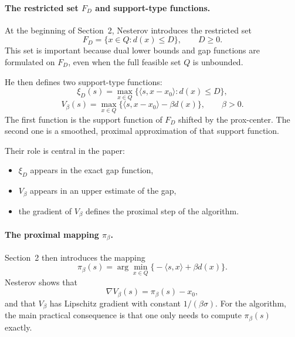 \documentclass[12pt,a4paper]{article}
\begin{document}
\paragraph{The restricted set $F_D$ and support-type functions.}
At the beginning of Section~2, Nesterov introduces the restricted set
\begin{equation}
    F_D = \{x \in Q : d(x) \le D\}, \qquad D \ge 0.
\end{equation}
This set is important because dual lower bounds and gap functions are formulated on $F_D$, even when the full feasible set $Q$ is unbounded.

He then defines two support-type functions:
\begin{equation}
    \xi_D(s) = \max_{x \in Q} \{ \langle s, x-x_0 \rangle : d(x) \le D \},
\end{equation}
\begin{equation}
    V_\beta(s) = \max_{x \in Q} \{ \langle s, x-x_0 \rangle - \beta d(x) \}, \qquad \beta > 0.
\end{equation}
The first function is the support function of $F_D$ shifted by the prox-center. The second one is a smoothed, proximal approximation of that support function.

Their role is central in the paper:
\begin{itemize}[leftmargin=1.2cm]
    \item $\xi_D$ appears in the exact gap function,
    \item $V_\beta$ appears in an upper estimate of the gap,
    \item the gradient of $V_\beta$ defines the proximal step of the algorithm.
\end{itemize}

\paragraph{The proximal mapping $\pi_\beta$.}
Section~2 then introduces the mapping
\begin{equation}
    \pi_\beta(s)
    = \arg\min_{x \in Q} \bigl\{-\langle s,x \rangle + \beta d(x)\bigr\}.
    \label{eq:pi-beta}
\end{equation}
Nesterov shows that
\begin{equation}
    \nabla V_\beta(s) = \pi_\beta(s) - x_0,
\end{equation}
and that $V_\beta$ has Lipschitz gradient with constant $1/(\beta\sigma)$. For the algorithm, the main practical consequence is that one only needs to compute $\pi_\beta(s)$ exactly.
\end{document}
